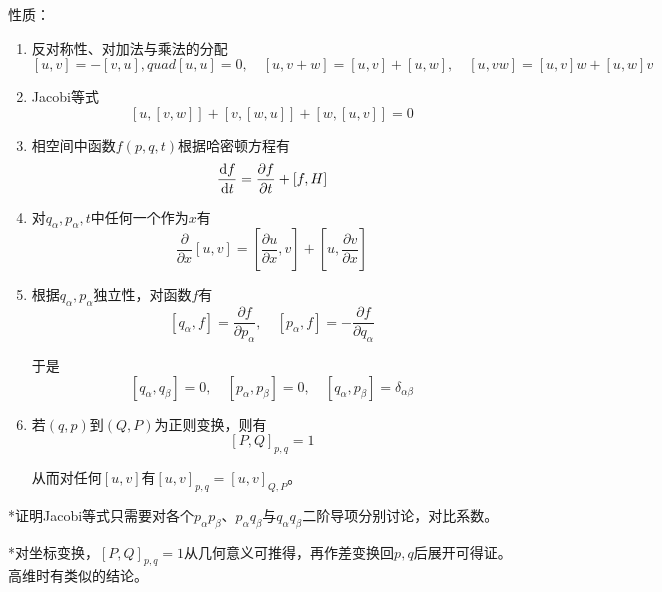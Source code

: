 \documentclass[a4paper,UTF8,fontset=windows]{ctexart}
\newcommand*{\dr}{\hspace{0.07em}\mathrm{d}}
\begin{document}
性质：
\begin{enumerate}
    \item 反对称性、对加法与乘法的分配
    $$[u,v]=-[v,u],quad[u,u]=0,\quad[u,v+w]=[u,v]+[u,w],\quad[u,vw]=[u,v]w+[u,w]v$$

    \item Jacobi等式
        $$[u,[v,w]]+[v,[w,u]]+[w,[u,v]]=0$$

    \item 相空间中函数$f(p,q,t)$根据哈密顿方程有
        $$\frac{\dr f}{\dr t}=\frac{\partial f}{\partial t}+[f,H]$$

    \item 对$q_\alpha,p_\alpha,t$中任何一个作为$x$有
    $$\frac{\partial}{\partial x}[u,v]=[\frac{\partial u}{\partial x},v]+[u,\frac{\partial v}{\partial x}]$$

    \item 根据$q_\alpha,p_\alpha$独立性，对函数$f$有
        $$[q_\alpha,f]=\frac{\partial f}{\partial p_\alpha},\quad [p_\alpha,f]=-\frac{\partial f}{\partial q_\alpha}$$

        于是
        $$[q_\alpha,q_\beta]=0,\quad[p_\alpha,p_\beta]=0,\quad[q_\alpha,p_\beta]=\delta_{\alpha\beta}$$

    \item 若$(q,p)$到$(Q,P)$为正则变换，则有
        $$[P,Q]_{p,q}=1$$

        从而对任何$[u,v]$有$[u,v]_{p,q}=[u,v]_{Q,P}$。
\end{enumerate}
*证明Jacobi等式只需要对各个$p_\alpha p_\beta$、$p_\alpha q_\beta$与$q_\alpha q_\beta$二阶导项分别讨论，对比系数。

*对坐标变换，$[P,Q]_{p,q}=1$从几何意义可推得，再作差变换回$p,q$后展开可得证。高维时有类似的结论。

\
\end{document}
